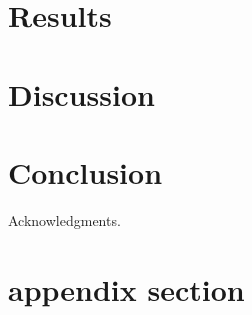 \documentclass[twocolumn]{aastex61}
\begin{document}

\section{Results}


\section{Discussion}



\section{Conclusion}

\acknowledgments
Acknowledgments.





\appendix
\section{appendix section}
\end{document}
